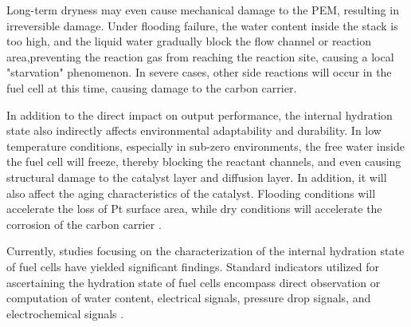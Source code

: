 Long-term dryness may even cause mechanical damage to the PEM, resulting in irreversible damage\cite{pattersonDamageCathodeCatalyst2006}.
Under flooding failure, the water content inside the stack is too high, and the liquid water gradually block the flow channel or reaction area,preventing the reaction gas from reaching the reaction site, causing a local "starvation" phenomenon\cite{chuExperimentalStudyInfluence2022,ohsModelingHydrogenStarvation2011}.
In severe cases, other side reactions  will occur in the fuel cell at this time, causing damage to the carbon carrier\cite{ohsModelingHydrogenStarvation2011,kuracinaStudySelectedCharacteristics2014,jiaMitigationStrategiesHydrogen2017}.
\par
In addition to the direct impact on output performance, the internal hydration state also indirectly affects environmental adaptability and durability\cite{yuanModelbasedObserversInternal2020,fuFuelCellHumidity2021}. In low temperature conditions, especially in sub-zero environments, the free water inside the fuel cell will freeze, thereby blocking the reactant channels, and even causing structural damage to the catalyst layer and diffusion layer\cite{taccaniEffectFlowField2011,doddsHydrogenFuelCell2015}. In addition, it will also affect the aging characteristics of the catalyst\cite{pattersonDamageCathodeCatalyst2006,sunModelingInfluenceGDL2005}. Flooding conditions will accelerate the loss of Pt surface area, while dry conditions will accelerate the corrosion of the carbon carrier \cite{yousfisteinerDiagnosisPolymerElectrolyte2011,chenOperationCharacteristicsCarbon2015}.
\par
Currently, studies focusing on the characterization of the internal hydration state of fuel cells have yielded significant findings. Standard indicators utilized for ascertaining the hydration state of fuel cells encompass direct observation or computation of water content, electrical signals, pressure drop signals, and electrochemical signals \cite{hussainiVisualizationQuantificationCathode2009}.
